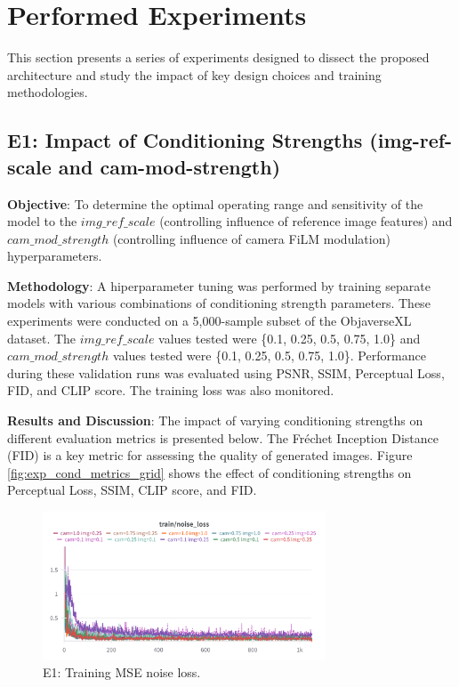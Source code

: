 \section{Performed Experiments}\label{sec:exp_analysis}

This section presents a series of experiments designed to dissect the proposed architecture and study the impact of key design choices and training methodologies.

\subsection{E1: Impact of Conditioning Strengths (img-ref-scale and cam-mod-strength)}\label{ssec:exp_conditioning_strengths}

\textbf{Objective}:
To determine the optimal operating range and sensitivity of the model to the $img\_ref\_scale$ (controlling influence of reference image features) and $cam\_mod\_strength$ (controlling influence of camera FiLM modulation) hyperparameters.

\textbf{Methodology}:
A hiperparameter tuning was performed by training separate models with various combinations of conditioning strength parameters. These experiments were conducted on a 5,000-sample subset of the ObjaverseXL dataset. The $img\_ref\_scale$ values tested were \{0.1, 0.25, 0.5, 0.75, 1.0\} and $cam\_mod\_strength$ values tested were \{0.1, 0.25, 0.5, 0.75, 1.0\}. Performance during these validation runs was evaluated using PSNR, SSIM, Perceptual Loss, FID, and CLIP score. The training loss was also monitored.

\textbf{Results and Discussion}:
The impact of varying conditioning strengths on different evaluation metrics is presented below. The Fréchet Inception Distance (FID) is a key metric for assessing the quality of generated images.
Figure \ref{fig:exp_cond_metrics_grid} shows the effect of conditioning strengths on Perceptual Loss, SSIM, CLIP score, and FID.

\begin{figure}[htbp]
  \centering
  \includegraphics[width=0.75\textwidth]{images/experiments/cam_img/train_loss.png}
  \caption{E1: Training MSE noise loss.}
  \label{fig:exp_cond_fid}
\end{figure}


